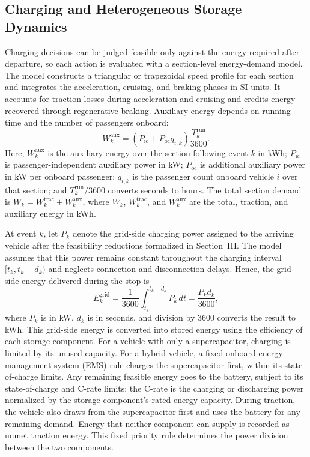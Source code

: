 \documentclass[conference]{IEEEtran}
\begin{document}
\subsection{Charging and Heterogeneous Storage Dynamics}
Charging decisions can be judged feasible only against the energy required after departure, so each action is evaluated with a section-level energy-demand model. The model constructs a triangular or trapezoidal speed profile for each section \cite{ghaviha2019speed} and integrates the acceleration, cruising, and braking phases in SI units. It accounts for traction losses during acceleration and cruising and credits energy recovered through regenerative braking. Auxiliary energy depends on running time and the number of passengers onboard:
\begin{equation}
    W^{\mathrm{aux}}_k = \left(P_{\mathrm{ic}} + P_{\mathrm{oc}} q_{i,k}\right)\frac{T^{\mathrm{run}}_k}{3600}.
\end{equation}
Here, $W^{\mathrm{aux}}_k$ is the auxiliary energy over the section following event $k$ in kWh; $P_{\mathrm{ic}}$ is passenger-independent auxiliary power in kW; $P_{\mathrm{oc}}$ is additional auxiliary power in kW per onboard passenger; $q_{i,k}$ is the passenger count onboard vehicle $i$ over that section; and $T^{\mathrm{run}}_k/3600$ converts seconds to hours. The total section demand is $W_k = W^{\mathrm{trac}}_k + W^{\mathrm{aux}}_k$, where $W_k$, $W^{\mathrm{trac}}_k$, and $W^{\mathrm{aux}}_k$ are the total, traction, and auxiliary energy in kWh.

At event $k$, let $P_k$ denote the grid-side charging power assigned to the arriving vehicle after the feasibility reductions formalized in Section~III. The model assumes that this power remains constant throughout the charging interval $[t_k,t_k+d_k)$ and neglects connection and disconnection delays. Hence, the grid-side energy delivered during the stop is
\begin{equation}
 E^{\mathrm{grid}}_k
 =\frac{1}{3600}\int_{t_k}^{t_k+d_k}P_k\,dt
 =\frac{P_kd_k}{3600},
\end{equation}
where $P_k$ is in kW, $d_k$ is in seconds, and division by 3600 converts the result to kWh. This grid-side energy is converted into stored energy using the efficiency of each storage component. For a vehicle with only a supercapacitor, charging is limited by its unused capacity. For a hybrid vehicle, a fixed onboard energy-management system (EMS) rule charges the supercapacitor first, within its state-of-charge limits. Any remaining feasible energy goes to the battery, subject to its state-of-charge and C-rate limits; the C-rate is the charging or discharging power normalized by the storage component's rated energy capacity. During traction, the vehicle also draws from the supercapacitor first and uses the battery for any remaining demand. Energy that neither component can supply is recorded as unmet traction energy. This fixed priority rule determines the power division between the two components.
\end{document}
